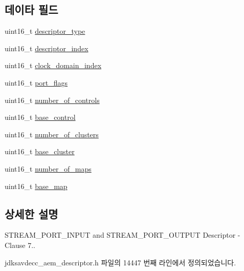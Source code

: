 \subsection*{데이타 필드}
\begin{DoxyCompactItemize}
\item 
uint16\+\_\+t \hyperlink{structjdksavdecc__descriptor__stream__port_ab7c32b6c7131c13d4ea3b7ee2f09b78d}{descriptor\+\_\+type}
\item 
uint16\+\_\+t \hyperlink{structjdksavdecc__descriptor__stream__port_a042bbc76d835b82d27c1932431ee38d4}{descriptor\+\_\+index}
\item 
uint16\+\_\+t \hyperlink{structjdksavdecc__descriptor__stream__port_a6608f023d147b556a49527d568abed8e}{clock\+\_\+domain\+\_\+index}
\item 
uint16\+\_\+t \hyperlink{structjdksavdecc__descriptor__stream__port_a60a1f1704542df3b3f6e6db56622ddd9}{port\+\_\+flags}
\item 
uint16\+\_\+t \hyperlink{structjdksavdecc__descriptor__stream__port_a0104bea638bdadf1a547c2b93813e22f}{number\+\_\+of\+\_\+controls}
\item 
uint16\+\_\+t \hyperlink{structjdksavdecc__descriptor__stream__port_af06eac7dd98377a85258308e8a25e7f2}{base\+\_\+control}
\item 
uint16\+\_\+t \hyperlink{structjdksavdecc__descriptor__stream__port_a4e1eccd0b455e87131e38deaa98b7a7d}{number\+\_\+of\+\_\+clusters}
\item 
uint16\+\_\+t \hyperlink{structjdksavdecc__descriptor__stream__port_a27affef7a010ca4446501e50e8d4bc92}{base\+\_\+cluster}
\item 
uint16\+\_\+t \hyperlink{structjdksavdecc__descriptor__stream__port_a6d00316ed943197ab46c0af22c1d430a}{number\+\_\+of\+\_\+maps}
\item 
uint16\+\_\+t \hyperlink{structjdksavdecc__descriptor__stream__port_ad71332cc282a2f8d6de8b12f56d8de28}{base\+\_\+map}
\end{DoxyCompactItemize}


\subsection{상세한 설명}
S\+T\+R\+E\+A\+M\+\_\+\+P\+O\+R\+T\+\_\+\+I\+N\+P\+UT and S\+T\+R\+E\+A\+M\+\_\+\+P\+O\+R\+T\+\_\+\+O\+U\+T\+P\+UT Descriptor -\/ Clause 7.. 

jdksavdecc\+\_\+aem\+\_\+descriptor.\+h 파일의 14447 번째 라인에서 정의되었습니다.



